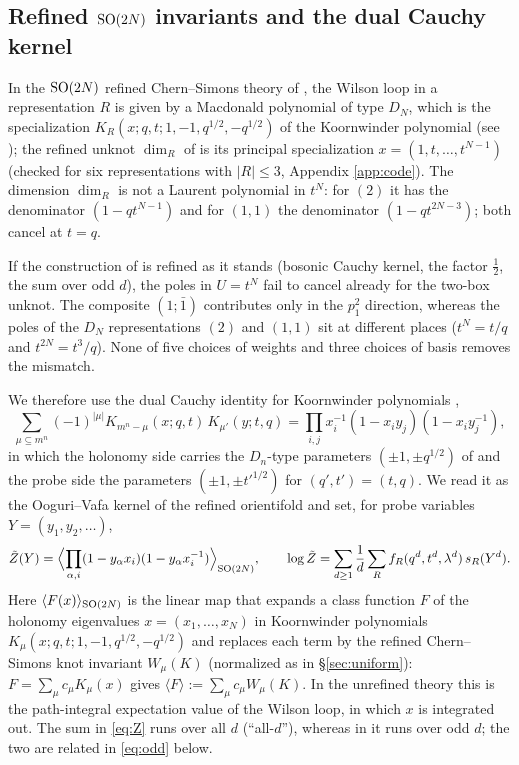 \subsection{Refined $\mathrm{SO}(2N)$ invariants and the dual Cauchy kernel}\label{sec:kernel}
In the $\mathrm{SO}(2N)$ refined Chern--Simons theory of \cite{AgSc12}, the Wilson loop in a representation $R$ is given by a Macdonald polynomial of type $D_N$, which is the specialization $K_R(x; q, t; 1, -1, q^{1/2}, -q^{1/2})$ of the Koornwinder polynomial \cite{Koornwinder92} (see \cite{vD96,Sahi99}); the refined unknot $\dim_R$ of \cite{AgSc12} is its principal specialization $x = (1, t, \dots, t^{N-1})$ (checked for six representations with $|R| \le 3$, Appendix \ref{app:code}). The dimension $\dim_R$ is not a Laurent polynomial in $t^N$: for $(2)$ it has the denominator $(1 - qt^{N-1})$ and for $(1,1)$ the denominator $(1 - qt^{2N-3})$; both cancel at $t = q$.

\begin{result}\label{cr:naive}
If the construction of \cite{Marino09} is refined as it stands (bosonic Cauchy kernel, the factor $\tfrac12$, the sum over odd $d$), the poles in $U = t^N$ fail to cancel already for the two-box unknot. The composite $(1;\bar1)$ contributes only in the $p_1^2$ direction, whereas the poles of the $D_N$ representations $(2)$ and $(1,1)$ sit at different places ($t^N = t/q$ and $t^{2N} = t^3/q$). None of five choices of weights and three choices of basis removes the mismatch.
\end{result}

We therefore use the dual Cauchy identity for Koornwinder polynomials \cite{Mimachi01},
\begin{equation}\label{eq:mimachi}
\sum_{\mu \subseteq m^n} (-1)^{|\mu|} K_{m^n - \mu}(x; q, t)\, K_{\mu'}(y; t, q) = \prod_{i, j} x_i^{-1}(1 - x_i y_j)(1 - x_i y_j^{-1}),
\end{equation}
in which the holonomy side carries the $D_n$-type parameters $(\pm1, \pm q^{1/2})$ of \cite{AgSc12} and the probe side the parameters $(\pm 1, \pm t'^{1/2})$ for $(q', t') = (t, q)$. We read it as the Ooguri--Vafa kernel of the refined orientifold and set, for probe variables $Y = (y_1, y_2, \dots)$,
\begin{equation}\label{eq:Z}
\tilde Z(Y) = \Bigl\langle \prod_{\alpha, i} (1 - y_\alpha x_i)(1 - y_\alpha x_i^{-1}) \Bigr\rangle_{\mathrm{SO}(2N)},\qquad
\log \tilde Z = \sum_{d \ge 1} \frac1d \sum_R f_R(q^d, t^d, \lambda^d)\, s_R(Y^d).
\end{equation}
Here $\langle F(x)\rangle_{\mathrm{SO}(2N)}$ is the linear map that expands a class function $F$ of the holonomy eigenvalues $x = (x_1, \dots, x_N)$ in Koornwinder polynomials $K_\mu(x; q, t; 1, -1, q^{1/2}, -q^{1/2})$ and replaces each term by the refined Chern--Simons knot invariant $W_\mu(K)$ (normalized as in \S\ref{sec:uniform}): $F = \sum_\mu c_\mu K_\mu(x)$ gives $\langle F\rangle := \sum_\mu c_\mu W_\mu(K)$. In the unrefined theory this is the path-integral expectation value of the Wilson loop, in which $x$ is integrated out. The sum in \eqref{eq:Z} runs over all $d$ (``all-$d$''), whereas in \cite{Marino09} it runs over odd $d$; the two are related in \eqref{eq:odd} below.

